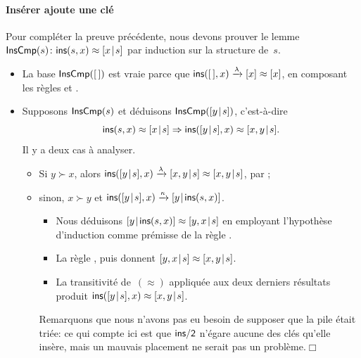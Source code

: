 \paragraph{Insérer ajoute une clé}

Pour compléter la preuve précédente, nous devons prouver le lemme
 \(\textsf{InsCmp}({s}) \colon
\textsf{ins}(s,x) \approx [{x}\!\mid\!{s}]\) par induction sur la structure
de~\(s\).
\begin{itemize}

  \item La base \(\textsf{InsCmp}({[\,]})\) est vraie parce que
  \(\textsf{ins}([\,],x) \xrightarrow{\smash{\lambda}} [x] \approx [x]\),
  en composant les règles  et .

  \item Supposons \(\textsf{InsCmp}({s})\) et déduisons
    \(\textsf{InsCmp}({[{y}\!\mid\!{s}]})\), c'est-à-dire
    \begin{equation*}
      \textsf{ins}(s,x) \approx [{x}\!\mid\!{s}] \Rightarrow
      \textsf{ins}([{y}\!\mid\!{s}],x) \approx [{x,y}\!\mid\!{s}].
    \end{equation*}
    Il y a deux cas à analyser.
    \begin{itemize}

    \item Si \(y \succ x\), alors \(\textsf{ins}([{y}\!\mid\!{s}],x)
      \xrightarrow{\smash{\lambda}} [{x,y}\!\mid\!{s}] \approx
      [{x,y}\!\mid\!{s}]\), par ;

    \item sinon, \(x \succ y\) et \(\textsf{ins}([{y}\!\mid\!{s}],x)
      \xrightarrow{\smash{\kappa}} [{y}\!\mid\!{\textsf{ins}(s,x)}]\).
      \begin{itemize}

        \item Nous déduisons \([{y}\!\mid\!{\textsf{ins}(s,x)}] \approx
          [{y,x}\!\mid\!{s}]\) en employant l'hypothèse d'induction comme
          prémisse de la règle .

        \item La règle , puis  donnent
          \([{y,x}\!\mid\!{s}] \approx [{x,y}\!\mid\!{s}]\).

        \item La transitivité de~\((\approx)\) appliquée aux deux
          derniers résultats produit \(\textsf{ins}([{y}\!\mid\!{s}],x)
          \approx [{x,y}\!\mid\!{s}]\).

      \end{itemize}
      Remarquons que nous n'avons pas eu besoin de supposer que la
      pile était triée: ce qui compte ici est que \(\textsf{ins/2}\)
      n'égare aucune des clés qu'elle insère, mais un mauvais
      placement ne serait pas un problème.\hfill\(\Box\)

    \end{itemize}

\end{itemize}


